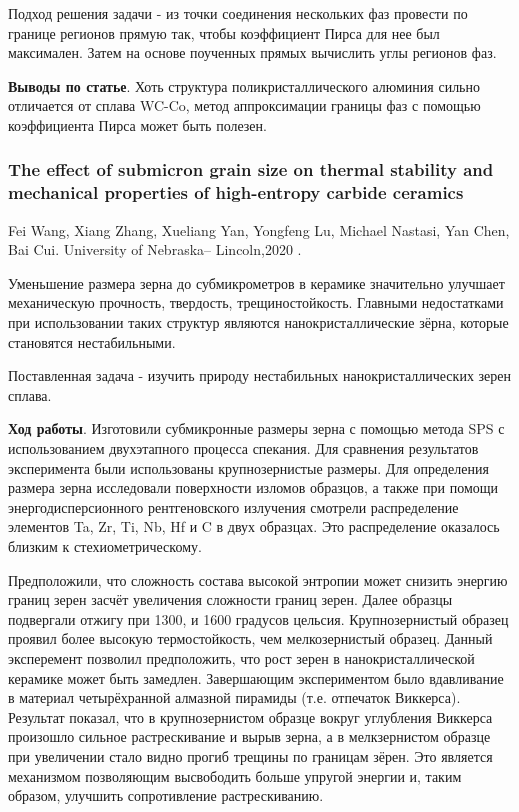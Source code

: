 \documentclass[a4paper, 14pt]{article}
\begin{document}
	Подход решения задачи - из точки соединения нескольких фаз провести по границе регионов прямую так, чтобы коэффициент Пирса для нее был максимален. Затем на основе поученных прямых вычислить углы регионов фаз.
	
	\textbf{Выводы по статье}. Хоть структура поликристаллического алюминия сильно отличается от сплава WC-Co, метод аппроксимации границы фаз с помощью коэффициента Пирса может быть полезен.
	
	\subsubsection{The effect of submicron grain size on thermal stability and mechanical properties of high-entropy carbide ceramics
}
	 Fei Wang, Xiang Zhang, Xueliang Yan, Yongfeng Lu, Michael Nastasi, Yan Chen, Bai Cui. University of Nebraska– Lincoln,2020 \cite{dayana_abstract_1}.
	 
	 Уменьшение размера зерна до субмикрометров в керамике значительно улучшает механическую
	 прочность, твердость, трещиностойкость. Главными недостатками при использовании
	 таких структур являются нанокристаллические зёрна, которые становятся нестабильными.
	 
	 Поставленная задача -  изучить природу нестабильных нанокристаллических зерен сплава.
	 
	 \textbf{Ход работы}. Изготовили субмикронные размеры зерна с помощью метода SPS с использованием
	 двухэтапного процесса спекания. Для сравнения результатов эксперимента были
	 использованы крупнозернистые размеры. Для определения размера зерна исследовали
	 поверхности изломов образцов, а также при помощи энергодисперсионного
	 рентгеновского излучения смотрели распределение элементов Ta, Zr, Ti, Nb, Hf и C в двух
	 образцах. Это распределение оказалось близким к стехиометрическому.
	 
	 Предположили,
	 что сложность состава высокой энтропии может снизить энергию границ зерен засчёт
	 увеличения сложности границ зерен. Далее образцы подвергали отжигу при 1300, и 1600
	 градусов цельсия. Крупнозернистый образец проявил более высокую термостойкость, чем
	 мелкозернистый образец. Данный эксперемент позволил предположить, что рост зерен в
	 нанокристаллической керамике может быть замедлен. Завершающим экспериментом было
	 вдавливание в материал четырёхранной алмазной пирамиды (т.е. отпечаток Виккерса).
	 Результат показал, что в крупнозернистом образце вокруг углубления Виккерса
	 произошло сильное растрескивание и вырыв зерна, а в мелкзернистом образце при
	 увеличении стало видно прогиб трещины по границам зёрен. Это является механизмом
	 позволяющим высвободить больше упругой энергии и, таким образом, улучшить
	 сопротивление растрескиванию.
	 
\end{document}
